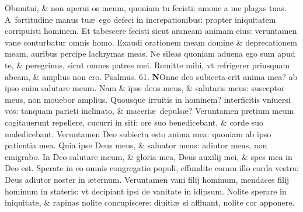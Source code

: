 \documentclass[a5paper,10pt]{book}
\def\ae{æ}
\begin{document}
\begin{multicols*}{2}
\newline \color{red} O\color{black}bmutui, \& non aperui os meum, quoniam tu fecisti: amoue a me plagas tuas.
\newline \color{red} A\color{black}\ fortitudine manus tu\ae \ ego defeci in increpationibus: propter iniquitatem corripuisti hominem.
\newline \color{red} E\color{black}t tabescere fecisti sicut araneam animam eius: veruntamen vane conturbatur omnis homo.
\newline \color{red} E\color{black}xaudi orationem meam domine \& deprecationem meam, auribus percipe lachrymas meas.
\newline \color{red} N\color{black}e sileas quoniam aduena ego sum apud te, \& peregrinus, sicut omnes patres mei.
\newline \color{red} R\color{black}emitte mihi, vt refrigerer priusquam abeam, \& amplius non ero.
\newline \color{red} Psalmus. \hypertarget{ps61}{61.} \color{black}
\vspace{-.5em}
\lettrine[lines=2]{\bfseries \color{red} N}{}Onne deo subiecta erit anima mea? ab ipso enim salutare meum.
\newline \color{red} N\color{black}am \& ipse deus meus, \& salutaris meus: susceptor meus, non mouebor amplius.
\newline \color{red} Q\color{black}uousque irruitis in hominem? interficitis vniuersi vos: tanquam parieti inclinato, \& maceri\ae \ depuls\ae ?
\newline \color{red} V\color{black}eruntamen pretium meum cogitauerunt repellere, cucurri in siti: ore suo benedicebant, \& corde suo maledicebant.
\newline \color{red} V\color{black}eruntamen Deo subiecta esto anima mea: quoniam ab ipso patientia mea.
\newline \color{red} Q\color{black}uia ipse Deus meus, \& saluator meus: adiutor meus, non emigrabo.
\newline \color{red} I\color{black}n Deo salutare meum, \& gloria mea, Deus auxilij mei, \& spes mea in Deo est.
\newline \color{red} S\color{black}perate in eo omnis congregatio populi, effundite coram illo corda vestra: Deus adiutor noster in \ae ternum.
\newline \color{red} V\color{black}eruntamen vani filij hominum, mendaces filij hominum in stateris: vt decipiant ipsi de vanitate in idipsum.
\newline \color{red} N\color{black}olite sperare in iniquitate, \& rapinas nolite concupiscere: diuiti\ae \ si affluant, nolite cor apponere.

\end{multicols*}
\end{document}
